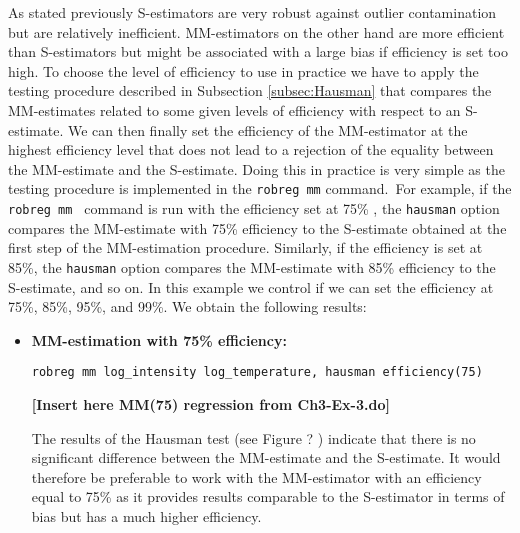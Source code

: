 \begin{stexample}
As stated previously S-estimators are very robust against outlier
contamination but are relatively inefficient. MM-estimators on the other hand
are more efficient than S-estimators but might be associated with a large bias
if efficiency is set too high. To choose the level of efficiency to use in
practice we have to apply the testing procedure described in Subsection
\ref{subsec:Hausman} that compares the MM-estimates related to some given
levels of efficiency with respect to an S-estimate. We can then finally set
the efficiency of the MM-estimator at the highest efficiency level that does
not lead to a rejection of the equality between the MM-estimate and the
S-estimate. Doing this in practice is very simple as the testing procedure is
implemented in the
\texttt{robreg mm}%
command.\ For example, if the
\texttt{robreg mm}%
\texttt{ }command is run with the efficiency set at 75\% , the
\texttt{hausman}%
option compares the MM-estimate with 75\% efficiency to the S-estimate
obtained at the first step of the MM-estimation procedure. Similarly, if the
efficiency is set at 85\%, the
\texttt{hausman}%
option compares the MM-estimate with 85\% efficiency to the S-estimate, and so
on. In this example we control if we can set the efficiency at 75\%, 85\%,
95\%, and 99\%. We obtain the following results:

\begin{itemize}
\item \textbf{MM-estimation with 75\% efficiency:}%

\texttt{robreg mm log\_intensity log\_temperature, hausman efficiency(75)}%


\textbf{[Insert here MM(75) regression from Ch3-Ex-3.do]} \ \newline

The results of the Hausman test (see Figure ?%
)
indicate that there is no significant difference between the MM-estimate and
the S-estimate. It would therefore be preferable to work with the MM-estimator
with an efficiency equal to 75\% as it provides results comparable to the
S-estimator in terms of bias but has a much higher efficiency.


\end{itemize}
\end{stexample}
